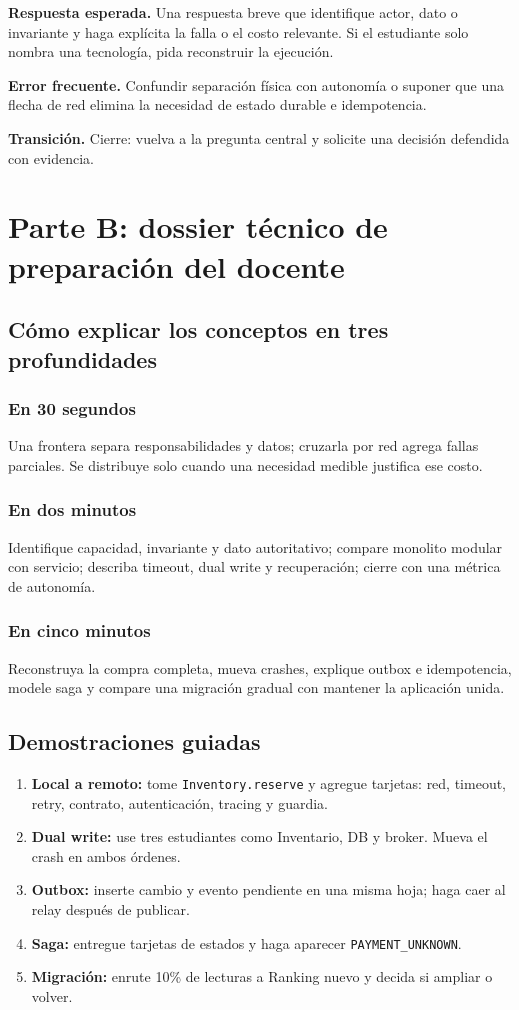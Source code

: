 \documentclass[variant=docente,cover=institutional,mode=screen]{ua-engineering-v6-article}
\begin{document}
\textbf{Respuesta esperada.} Una respuesta breve que identifique actor, dato o invariante y haga explícita la falla o el costo relevante. Si el estudiante solo nombra una tecnología, pida reconstruir la ejecución.

\textbf{Error frecuente.} Confundir separación física con autonomía o suponer que una flecha de red elimina la necesidad de estado durable e idempotencia.

\textbf{Transición.} Cierre: vuelva a la pregunta central y solicite una decisión defendida con evidencia.

\section{Parte B: dossier técnico de preparación del docente}

\subsection{Cómo explicar los conceptos en tres profundidades}
\subsubsection*{En 30 segundos}
Una frontera separa responsabilidades y datos; cruzarla por red agrega fallas parciales. Se distribuye solo cuando una necesidad medible justifica ese costo.
\subsubsection*{En dos minutos}
Identifique capacidad, invariante y dato autoritativo; compare monolito modular con servicio; describa timeout, dual write y recuperación; cierre con una métrica de autonomía.
\subsubsection*{En cinco minutos}
Reconstruya la compra completa, mueva crashes, explique outbox e idempotencia, modele saga y compare una migración gradual con mantener la aplicación unida.

\subsection{Demostraciones guiadas}
\begin{enumerate}
\item \textbf{Local a remoto:} tome \texttt{Inventory.reserve} y agregue tarjetas: red, timeout, retry, contrato, autenticación, tracing y guardia.
\item \textbf{Dual write:} use tres estudiantes como Inventario, DB y broker. Mueva el crash en ambos órdenes.
\item \textbf{Outbox:} inserte cambio y evento pendiente en una misma hoja; haga caer al relay después de publicar.
\item \textbf{Saga:} entregue tarjetas de estados y haga aparecer \texttt{PAYMENT\_UNKNOWN}.
\item \textbf{Migración:} enrute 10\% de lecturas a Ranking nuevo y decida si ampliar o volver.
\end{enumerate}
\end{document}
